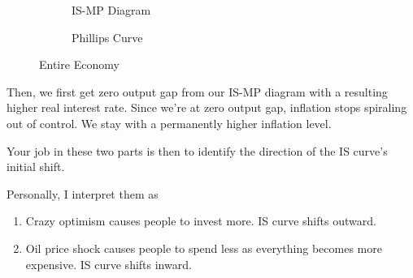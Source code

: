 \documentclass[11pt]{scrartcl}
\newcommand{\og}{\ensuremath{\tilde{Y}}}
\begin{document}
\begin{figure}[H]
\begin{subfigure}[b]{0.5\textwidth}
\centering
{}
\caption{\color{blue}IS-\color{black}MP Diagram}
\end{subfigure}
\hspace{2ex}
\begin{subfigure}[b]{0.5\textwidth}
\centering
{}
\caption{Phillips Curve}
\end{subfigure}
\caption{Entire Economy}
\end{figure}

Then, we first get zero output gap from our IS-MP diagram with a resulting higher real interest rate. Since we're at zero output gap, inflation stops spiraling out of control. We stay with a permanently higher inflation level. 

Your job in these two parts is then to identify the direction of the IS curve's initial shift. 

Personally, I interpret them as

\begin{enumerate}
\item Crazy optimism causes people to invest more. IS curve shifts outward.
\item Oil price shock causes people to spend less as everything becomes more expensive. IS curve shifts inward.
\end{enumerate}
\end{document}
